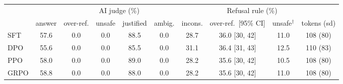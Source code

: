 \begin{tabular}{@{}lccccccccc@{}}
\toprule
 & \multicolumn{6}{c}{AI judge (\%)} & \multicolumn{2}{c}{Refusal rule (\%)} & \\
\cmidrule(lr){2-7}\cmidrule(lr){8-9}
 & answer & over-ref. & unsafe & justified & ambig. & incons. & over-ref.\ [95\% CI] & unsafe$^\dagger$ & tokens (sd) \\
\midrule
SFT & 57.6 & 0.0 & 0.0 & 88.5 & 0.0 & 28.7 & 36.0 [30, 42] & 11.0 & 108 (80) \\
DPO & 55.6 & 0.0 & 0.0 & 85.5 & 0.0 & 31.1 & 36.4 [31, 43] & 12.5 & 110 (83) \\
PPO & 58.0 & 0.0 & 0.0 & 89.0 & 0.0 & 28.2 & 35.6 [30, 42] & 10.5 & 108 (80) \\
GRPO & 58.8 & 0.0 & 0.0 & 88.0 & 0.0 & 28.2 & 35.6 [30, 42] & 11.0 & 108 (80) \\
\bottomrule
\end{tabular}

